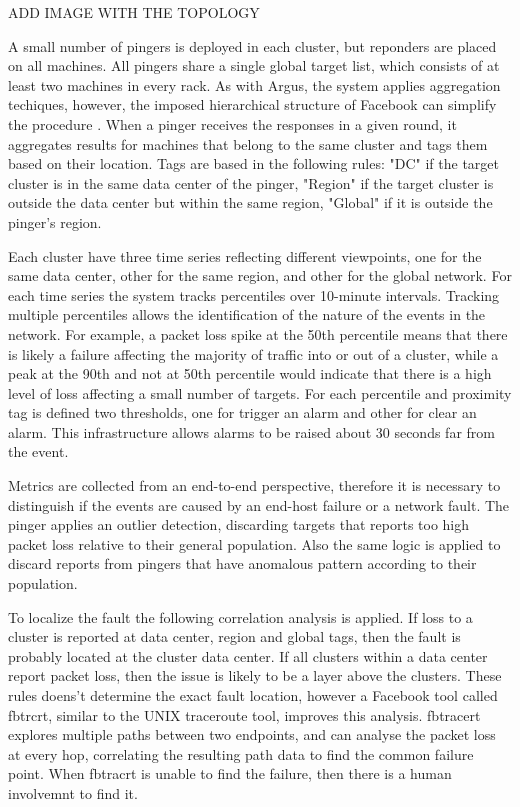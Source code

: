 ADD IMAGE WITH THE TOPOLOGY

A small number of pingers is deployed in each cluster, but reponders are placed
on
all machines. All pingers share a single global target list, which consists of
at least two machines in every rack.
As with Argus, the system applies aggregation techiques, however, the imposed
hierarchical structure of Facebook can simplify the procedure
. When a pinger receives the responses in a given round, it
aggregates results for machines that belong to the same cluster and tags them
based on their location. Tags are based in the following rules:
"DC" if the target cluster is in the same data center of the pinger,
"Region" if the target cluster is outside the
data center but within the same region, "Global" if it is outside the pinger's
region.

Each cluster have three time series reflecting different
viewpoints, one for the same data center, other for the same region, and other
for the global network. For each time series the system tracks percentiles
over 10-minute
intervals. Tracking multiple percentiles allows the identification of the
nature of the events in the network. For example, a packet loss spike at the
50th percentile means that there is likely a failure affecting the majority of
traffic into or out of a cluster, while a peak at the 90th and not at 50th
percentile would indicate that there is a high level of loss affecting a small
number of targets. For each percentile and proximity tag is defined two
thresholds, one for trigger an alarm and other for clear an alarm. This
infrastructure allows alarms to be raised about 30 seconds far from the event.

Metrics are collected from an end-to-end perspective, therefore it
is necessary to distinguish if the events are caused by an end-host failure or
a network fault. The pinger applies an outlier detection,
discarding targets that reports too high packet loss relative to their general
population. Also the same logic is applied to discard reports from pingers that
have anomalous pattern according to their population.

To localize the fault the following
correlation analysis is applied. If loss to a cluster is reported at data center,
region and global tags, then the fault is probably located at the cluster data center.
If all clusters within a data center report packet loss, then the issue is
likely to be a layer above the clusters. These rules doens't determine the
exact fault location, however a Facebook tool called fbtrcrt, similar to the
UNIX traceroute tool, improves this analysis. fbtracert explores multiple
paths between two endpoints, and can analyse the
packet loss at every hop, correlating the resulting path data to find the
common failure point. When fbtracrt is unable to find the failure, then there
is a human involvemnt to find it.

